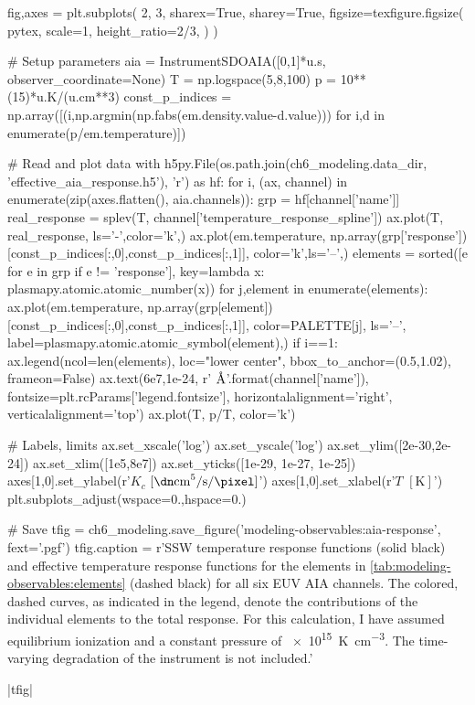 \begin{pycode}
fig,axes = plt.subplots(
    2, 3, sharex=True, sharey=True,
    figsize=texfigure.figsize(
        pytex, 
        scale=1,
        height_ratio=2/3,       
    )
)

# Setup parameters
aia = InstrumentSDOAIA([0,1]*u.s, observer_coordinate=None)
T = np.logspace(5,8,100)
p = 10**(15)*u.K/(u.cm**3)
const_p_indices = np.array([(i,np.argmin(np.fabs(em.density.value-d.value))) 
                            for i,d in enumerate(p/em.temperature)])

# Read and plot data
with h5py.File(os.path.join(ch6_modeling.data_dir, 'effective_aia_response.h5'), 'r') as hf:
    for i, (ax, channel) in enumerate(zip(axes.flatten(), aia.channels)):
        grp = hf[channel['name']]
        real_response = splev(T, channel['temperature_response_spline'])
        ax.plot(T, real_response, ls='-',color='k',)
        ax.plot(em.temperature, 
                np.array(grp['response'])[const_p_indices[:,0],const_p_indices[:,1]],
                color='k',ls='--',)
        elements = sorted([e for e in grp if e != 'response'],
                            key=lambda x: plasmapy.atomic.atomic_number(x))
        for j,element in enumerate(elements):
            ax.plot(em.temperature, 
                    np.array(grp[element])[const_p_indices[:,0],const_p_indices[:,1]],
                    color=PALETTE[j], ls='--', label=plasmapy.atomic.atomic_symbol(element),)
        if i==1:
            ax.legend(ncol=len(elements), loc="lower center", bbox_to_anchor=(0.5,1.02),
                      frameon=False)
        ax.text(6e7,1e-24, r'{} $\si{{\angstrom}}$'.format(channel['name']),
                fontsize=plt.rcParams['legend.fontsize'],
                horizontalalignment='right', verticalalignment='top')
ax.plot(T, p/T, color='k')

# Labels, limits
ax.set_xscale('log')
ax.set_yscale('log')
ax.set_ylim([2e-30,2e-24])
ax.set_xlim([1e5,8e7])
ax.set_yticks([1e-29, 1e-27, 1e-25])
axes[1,0].set_ylabel(r'$K_c$ $[\si{\dn\cm\tothe{5}\per\second\per\pixel}]$')
axes[1,0].set_xlabel(r'$T$ $[\si{\kelvin}]$')
plt.subplots_adjust(wspace=0.,hspace=0.)

# Save
tfig = ch6_modeling.save_figure('modeling-observables:aia-response', fext='.pgf')
tfig.caption = r'SSW temperature response functions (solid black) and effective temperature response functions for the elements in \autoref{tab:modeling-observables:elements} (dashed black) for all six EUV AIA channels. The colored, dashed curves, as indicated in the legend, denote the contributions of the individual elements to the total response. For this calculation, I have assumed equilibrium ionization and a constant pressure of \SI{e15}{\kelvin\per\cubic\cm}. The time-varying degradation of the instrument is not included.'
\end{pycode}
|tfig|

